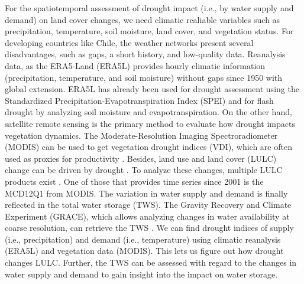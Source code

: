 \documentclass[
  authoryear,
  preprint,
  3p,
  onecolumn]{elsarticle}
\begin{document}
For the spatiotemporal assessment of drought impact (i.e., by water
supply and demand) on land cover changes, we need climatic realiable
variables such as precipitation, temperature, soil moisture, land cover,
and vegetation status. For developing countries like Chile, the weather
networks present several disadvantages, such as gaps, a short history,
and low-quality data. Reanalysis data, as the ERA5-Land (ERA5L)
\citep{MunozSabater2021} provides hourly climatic information
(precipitation, temperature, and soil moisture) without gaps since 1950
with global extension. ERA5L has already been used for drought
assessment using the Standardized Precipitation-Evapotranspiration Index
(SPEI) \citep{Nouri2023} and for flash drought \citep{Wang2023} by
analyzing soil moisture and evapotranspiration. On the other hand,
satellite remote sensing \citep{West2019, AghaKouchak2015} is the
primary method to evaluate how drought impacts vegetation dynamics. The
Moderate-Resolution Imaging Spectroradiometer (MODIS) can be used to get
vegetation drought indices (VDI), which are often used as proxies for
productivity \citep{Paruelo2016, Schucknecht2017}. Besides, land use and
land cover (LULC) change can be driven by drought
\citep{Tran2019, Akinyemi2021}. To analyze these changes, multiple LULC
products exist \citep{Grekousis2015}. One of those that provides time
series since 2001 is the MCD12Q1 \citep{Friedl2019} from MODIS. The
variation in water supply and demand is finally reflected in the total
water storage (TWS). The Gravity Recovery and Climate Experiment
(GRACE), which allows analyzing changes in water availability at coarse
resolution, can retrieve the TWS \citep{Ahmed2014, Ma2017}. We can find
drought indices of supply (i.e., precipitation) and demand (i.e.,
temperature) using climatic reanalysis (ERA5L) and vegetation data
(MODIS). This lets us figure out how drought changes LULC. Further, the
TWS can be assessed with regard to the changes in water supply and
demand to gain insight into the impact on water storage.
\end{document}
